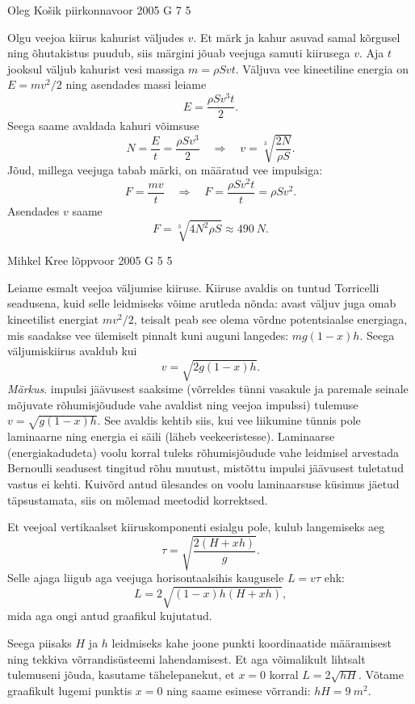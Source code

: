 \documentclass[11pt, twoside]{article}
\begin{document}
{%
{Oleg Košik} %
{piirkonnavoor} %
{2005} %
{G 7} %
{5} %
{

\ifSolution
Olgu veejoa kiirus kahurist väljudes $v$. Et märk ja kahur asuvad samal kõrgusel ning õhutakistus puudub, siis märgini jõuab veejuga samuti kiirusega $v$. Aja $t$ jooksul väljub kahurist vesi massiga $m = \rho Svt$. Väljuva vee kineetiline energia on $E = mv^2/2$ ning asendades massi leiame
\[
E = \frac{\rho Sv^3t}{2}.
\]
Seega saame avaldada kahuri võimsuse
\[
N=\frac{E}{t}=\frac{\rho S v^{3}}{2} \quad \Rightarrow \quad v=\sqrt[3]{\frac{2 N}{\rho S}}.
\]
Jõud, millega veejuga tabab märki, on määratud vee impulsiga:
\[
F=\frac{m v}{t} \quad \Rightarrow \quad F=\frac{\rho S v^{2} t}{t}=\rho S v^{2}.
\]
Asendades $v$ saame
\[
F=\sqrt[3]{4 N^{2} \rho S} \approx \SI{490}{N}.
\]
\fi
}

{Mihkel Kree} %
{lõppvoor} %
{2005} %
{G 5} %
{5} %
{

\ifSolution
Leiame esmalt veejoa väljumise kiiruse. Kiiruse avaldis on tuntud Torricelli seadusena, kuid selle leidmiseks võime arutleda nõnda: avast väljuv juga omab kineetilist energiat $mv^2/2$, teisalt peab see olema võrdne potentsiaalse energiaga, mis saadakse vee ülemiselt pinnalt kuni auguni langedes: $mg(1 - x)h$. Seega väljumiskiirus avaldub kui
\[
v = \sqrt{2g(1 - x)h}.
\]
\emph{Märkus}. impulsi jäävusest saaksime (võrreldes tünni vasakule ja paremale seinale mõjuvate rõhumisjõudude vahe avaldist ning veejoa impulssi) tulemuse $v = \sqrt{g(1 - x)h}$. See avaldis kehtib siis, kui vee liikumine tünnis pole laminaarne ning energia ei säili (läheb veekeeristesse). Laminaarse (energiakadudeta) voolu korral tuleks rõhumisjõudude vahe leidmisel arvestada Bernoulli seadusest tingitud rõhu muutust, mistõttu impulsi jäävusest tuletatud vastus ei kehti. Kuivõrd antud ülesandes on voolu laminaarsuse küsimus jäetud täpsustamata, siis on mõlemad meetodid korrektsed.

Et veejoal vertikaalset kiiruskomponenti esialgu pole, kulub langemiseks aeg
\[
\tau = \sqrt{\frac{2(H+xh)}{g}}.
\]
Selle ajaga liigub aga veejuga horisontaalsihis kaugusele $L = v\tau$ ehk:
\[
L=2 \sqrt{(1-x) h(H+x h)},
\]
mida aga ongi antud graafikul kujutatud.

Seega piisaks $H$ ja $h$ leidmiseks kahe joone punkti koordinaatide määramisest ning tekkiva võrrandisüsteemi lahendamisest. Et aga võimalikult lihtsalt tulemuseni jõuda, kasutame tähelepanekut, et $x = 0$ korral $L = 2\sqrt{hH}$. Võtame graafikult lugemi punktis $x = 0$ ning saame esimese võrrandi: $hH = \SI{9}{m^2}$.

}}
\end{document}
